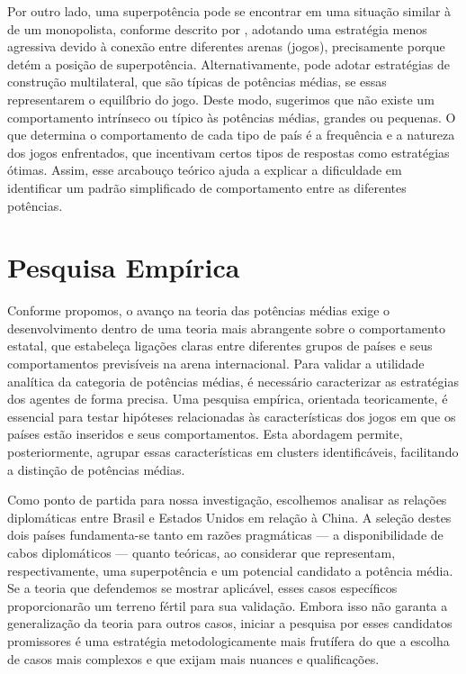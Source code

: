 \documentclass[]{interact}
\theoremstyle{plain}%
\theoremstyle{definition}
\theoremstyle{remark}
\begin{document}
Por outro lado, uma superpotência pode se encontrar em uma situação
similar à de um monopolista, conforme descrito por
\citet{bulow_etal_85}, adotando uma estratégia menos agressiva devido à
conexão entre diferentes arenas (jogos), precisamente porque detém a
posição de superpotência. Alternativamente, pode adotar estratégias de
construção multilateral, que são típicas de potências médias, se essas
representarem o equilíbrio do jogo. Deste modo, sugerimos que não existe
um comportamento intrínseco ou típico às potências médias, grandes ou
pequenas. O que determina o comportamento de cada tipo de país é a
frequência e a natureza dos jogos enfrentados, que incentivam certos
tipos de respostas como estratégias ótimas. Assim, esse arcabouço
teórico ajuda a explicar a dificuldade em identificar um padrão
simplificado de comportamento entre as diferentes potências.

\hypertarget{pesquisa-empuxedrica}{%
\section{Pesquisa Empírica}\label{pesquisa-empuxedrica}}

Conforme propomos, o avanço na teoria das potências médias exige o
desenvolvimento dentro de uma teoria mais abrangente sobre o
comportamento estatal, que estabeleça ligações claras entre diferentes
grupos de países e seus comportamentos previsíveis na arena
internacional. Para validar a utilidade analítica da categoria de
potências médias, é necessário caracterizar as estratégias dos agentes
de forma precisa. Uma pesquisa empírica, orientada teoricamente, é
essencial para testar hipóteses relacionadas às características dos
jogos em que os países estão inseridos e seus comportamentos. Esta
abordagem permite, posteriormente, agrupar essas características em
clusters identificáveis, facilitando a distinção de potências médias.

Como ponto de partida para nossa investigação, escolhemos analisar as
relações diplomáticas entre Brasil e Estados Unidos em relação à China.
A seleção destes dois países fundamenta-se tanto em razões pragmáticas
--- a disponibilidade de cabos diplomáticos --- quanto teóricas, ao
considerar que representam, respectivamente, uma superpotência e um
potencial candidato a potência média. Se a teoria que defendemos se
mostrar aplicável, esses casos específicos proporcionarão um terreno
fértil para sua validação. Embora isso não garanta a generalização da
teoria para outros casos, iniciar a pesquisa por esses candidatos
promissores é uma estratégia metodologicamente mais frutífera do que a
escolha de casos mais complexos e que exijam mais nuances e
qualificações.
\end{document}
